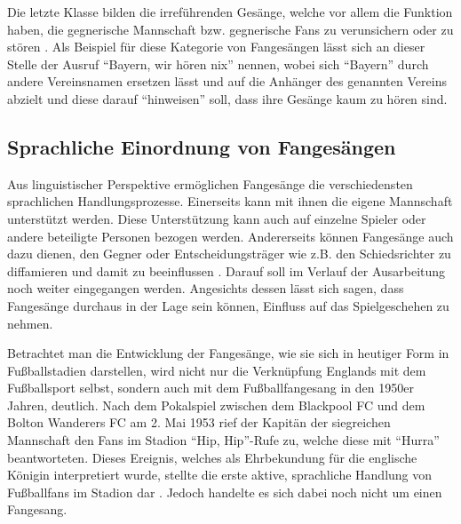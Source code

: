 Die letzte Klasse bilden die irreführenden Gesänge, welche vor allem die Funktion haben, die gegnerische Mannschaft bzw. gegnerische Fans zu verunsichern oder zu stören \cite[S. 11]{FK14}.
Als Beispiel für diese Kategorie von Fangesängen lässt sich an dieser Stelle der Ausruf "`Bayern, wir hören nix"' nennen, wobei sich "`Bayern"' durch andere Vereinsnamen ersetzen lässt und auf die Anhänger des genannten Vereins abzielt und diese darauf "`hinweisen"' soll, dass ihre Gesänge kaum zu hören sind.

\subsection{Sprachliche Einordnung von Fangesängen}
Aus linguistischer Perspektive ermöglichen Fangesänge die verschiedensten sprachlichen Handlungsprozesse.
Einerseits kann mit ihnen die eigene Mannschaft unterstützt werden.
Diese Unterstützung kann auch auf einzelne Spieler oder andere beteiligte Personen bezogen werden.
Andererseits können Fangesänge auch dazu dienen, den Gegner oder Entscheidungsträger wie z.B. den Schiedsrichter zu diffamieren und damit zu beeinflussen \cite[S. 167]{RK98}.
Darauf soll im Verlauf der Ausarbeitung noch weiter eingegangen werden.
Angesichts dessen lässt sich sagen, dass Fangesänge durchaus in der Lage sein können, Einfluss auf das Spielgeschehen zu nehmen.

Betrachtet man die Entwicklung der Fangesänge, wie sie sich in heutiger Form in Fußballstadien darstellen, wird nicht nur die Verknüpfung Englands mit dem Fußballsport selbst, sondern auch mit dem Fußballfangesang in den 1950er Jahren, deutlich.
Nach dem Pokalspiel zwischen dem Blackpool FC und dem Bolton Wanderers FC am 2. Mai 1953 rief der Kapitän der siegreichen Mannschaft den Fans im Stadion "`Hip, Hip"'-Rufe zu, welche diese mit "`Hurra"' beantworteten.
Dieses Ereignis, welches als Ehrbekundung für die englische Königin interpretiert wurde, stellte die erste aktive, sprachliche Handlung von Fußballfans im Stadion dar \cite[S. 65]{RK98}.
Jedoch handelte es sich dabei noch nicht um einen Fangesang.


